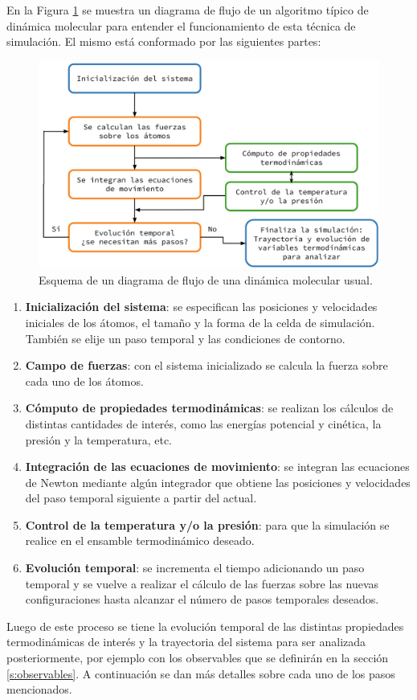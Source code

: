 En la Figura \ref{fig:esquema_md} se muestra un diagrama de flujo de un algoritmo
típico de dinámica molecular para entender el funcionamiento de esta técnica de 
simulación. El mismo está conformado por las siguientes partes:
\begin{figure}[h!]
    \centering
    \includegraphics[width=\textwidth]{Metodos/atomicos/esquema.png}
    \caption{Esquema de un diagrama de flujo de una dinámica molecular usual.}
    \label{fig:esquema_md}
\end{figure}
\begin{enumerate}
    \item \textbf{Inicialización del sistema}: se especifican las posiciones y
        velocidades iniciales de los átomos, el tamaño y la forma de la celda de 
        simulación. También se elije un paso temporal y las condiciones de 
        contorno.
    \item \textbf{Campo de fuerzas}: con el sistema inicializado se calcula la 
        fuerza sobre cada uno de los átomos.
    \item \textbf{Cómputo de propiedades termodinámicas}: se realizan los
        cálculos de distintas cantidades de interés, como las energías potencial
        y cinética, la presión y la temperatura, etc.
    \item \textbf{Integración de las ecuaciones de movimiento}: se integran las
        ecuaciones de Newton mediante algún integrador que obtiene las posiciones
        y velocidades del paso temporal siguiente a partir del actual.
    \item \textbf{Control de la temperatura y/o la presión}: para que la 
        simulación se realice en el ensamble termodinámico deseado.
    \item \textbf{Evolución temporal}: se incrementa el tiempo adicionando un
        paso temporal y se vuelve a realizar el cálculo de las fuerzas sobre las 
        nuevas configuraciones hasta alcanzar el número de pasos temporales 
        deseados.
\end{enumerate}
Luego de este proceso se tiene la evolución temporal de las distintas propiedades
termodinámicas de interés y la trayectoria del sistema para ser analizada 
posteriormente, por ejemplo con los observables que se definirán en la sección 
\ref{s:observables}. A continuación se dan más detalles sobre cada uno de los 
pasos mencionados.


